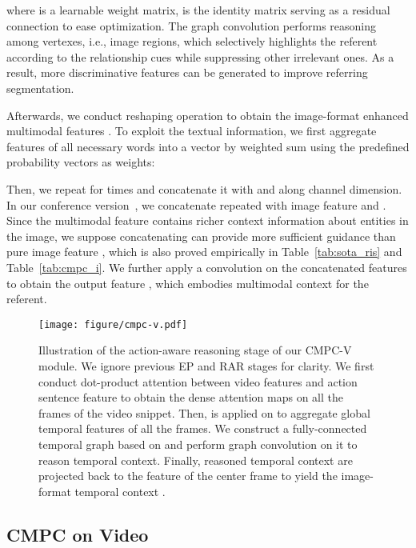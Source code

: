 \documentclass[10pt,journal,cspaper,compsoc]{IEEEtran}
\begin{document}
where  is a learnable weight matrix, 
 is the identity matrix serving as a residual connection to ease optimization.
The graph convolution performs reasoning among vertexes, i.e., image regions, which selectively highlights the referent according to the relationship cues while suppressing other irrelevant ones. As a result, more discriminative features can be generated to improve referring segmentation.

Afterwards, we conduct reshaping operation to obtain the image-format enhanced multimodal 
features .
To exploit the textual information, we first aggregate features of all necessary 
words into a vector  by weighted sum using the predefined probability vectors as weights:

Then, we repeat  for  
times and concatenate it with  and  along channel dimension. 
In our conference version~\cite{huang2020cmpc}, we concatenate repeated  with image feature  and . 
Since the multimodal feature  contains richer context information about entities in the image, we suppose concatenating  can provide more sufficient guidance than pure image feature , which is also proved empirically in Table~\ref{tab:sota_ris} and Table~\ref{tab:cmpc_i}. 
We further apply a  convolution on the concatenated features to obtain the output feature , which embodies multimodal context for the referent.

\begin{figure*}[t]
   \begin{center}
      \texttt{[image: figure/cmpc-v.pdf]}
   \end{center}
      \caption{Illustration of the action-aware reasoning stage of our CMPC-V module. 
      We ignore previous EP and RAR stages for clarity. 
      We first conduct dot-product attention between video features  and action sentence feature  to obtain the dense attention maps  on all the frames of the video snippet. 
      Then,  is applied on  to aggregate global temporal features  of all the frames. 
      We construct a fully-connected temporal graph  based on  and perform graph convolution on it to reason temporal context. 
      Finally, reasoned temporal context are projected back to the feature of the center frame  to yield the image-format temporal context .}
   \label{fig:cmpcv}
\end{figure*}

\subsection{CMPC on Video}
\end{document}
